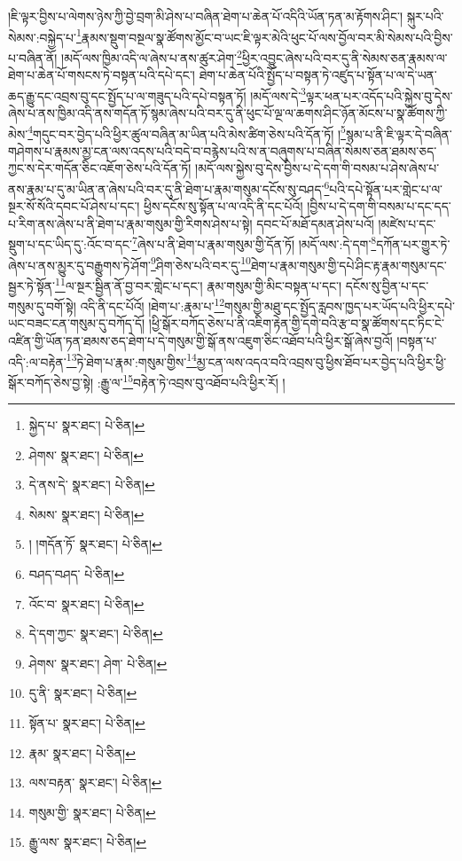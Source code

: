 །ཇི་ལྟར་བྱིས་པ་ལེགས་ཉེས་ཀྱི་བྱེ་བྲག་མི་ཤེས་པ་བཞིན་ཐེག་པ་ཆེན་པོ་འདིའི་ཡོན་ཏན་མ་རྟོགས་ཤིང་། སྐུར་པའི་སེམས་:བསྐྱེད་པ་\footnote{སྐྱེད་པ་  སྣར་ཐང་།  པེ་ཅིན། }རྣམས་སྡུག་བསྔལ་སྣ་ཚོགས་མྱོང་བ་ཡང་ཇི་ལྟར་མེའི་ཕུང་པོ་ལས་བྱོལ་བར་མི་སེམས་པའི་བྱིས་པ་བཞིན་ནོ། །མདོ་ལས་ཁྱིམ་འདི་ལ་ཞེས་པ་ནས་ཚུར་ཤེག་\footnote{ཤེགས་  སྣར་ཐང་།  པེ་ཅིན། }ཕྱིར་འབྱུང་ཞེས་པའི་བར་དུ་ནི་སེམས་ཅན་རྣམས་ལ་ཐེག་པ་ཆེན་པོ་གསངས་ཏེ་བསྟན་པའི་དཔེ་དང་། ཐེག་པ་ཆེན་པོའི་སྤྱོད་པ་བསྟན་ཏེ་འཛུད་པ་སྟོན་པ་ལ་དེ་ཡན་ཆད་རྒྱུ་དང་འབྲས་བུ་དང་སྤྱོད་པ་ལ་གཟུད་པའི་དཔེ་བསྟན་ཏོ། །མདོ་ལས་དེ་\footnote{དེ་ནས་དེ་  སྣར་ཐང་།  པེ་ཅིན། }ལྟར་ཕན་པར་འདོད་པའི་སྐྱེས་བུ་དེས་ཞེས་པ་ནས་ཁྱིམ་འདི་ནས་གདོན་ཏོ་སྙམ་ཞེས་པའི་བར་དུ་ནི་ཕུང་པོ་ལྔ་ལ་ཆགས་ཤིང་ཉོན་མོངས་པ་སྣ་ཚོགས་ཀྱི་མེས་\footnote{སེམས་  སྣར་ཐང་།  པེ་ཅིན། }གདུང་བར་བྱེད་པའི་ཕྱིར་ཚུལ་བཞིན་མ་ཡིན་པའི་མེས་ཚིག་ཅེས་པའི་དོན་ཏོ། །\footnote{། །གདོན་ཏོ་  སྣར་ཐང་།  པེ་ཅིན། }སྙམ་པ་ནི་ཇི་ལྟར་དེ་བཞིན་གཤེགས་པ་རྣམས་མྱ་ངན་ལས་འདས་པའི་བདེ་བ་བརྙེས་པའི་ས་ན་བཞུགས་པ་བཞིན་སེམས་ཅན་ཐམས་ཅད་ཀྱང་ས་དེར་གདོན་ཅིང་འཇོག་ཅེས་པའི་དོན་ཏོ། །མདོ་ལས་སྐྱེས་བུ་དེས་བྱིས་པ་དེ་དག་གི་བསམ་པ་ཤེས་ཞེས་པ་ནས་རྣམ་པ་དུ་མ་ཡིན་ན་ཞེས་པའི་བར་དུ་ནི་ཐེག་པ་རྣམ་གསུམ་དངོས་སུ་བཤད་\footnote{བཤད་བཤད་  པེ་ཅིན། }པའི་དཔེ་སྟོན་པར་གླེང་པ་ལ་སྔར་སོ་སོའི་དབང་པོ་ཤེས་པ་དང་། ཕྱིས་དངོས་སུ་སྟོན་པ་ལ་འདི་ནི་དང་པོའོ། །བྱིས་པ་དེ་དག་གི་བསམ་པ་དང་དད་པ་རིག་ནས་ཞེས་པ་ནི་ཐེག་པ་རྣམ་གསུམ་གྱི་རིགས་ཤེས་པ་སྟེ། དབང་པོ་མཐོ་དམན་ཤེས་པའོ། །མཛེས་པ་དང་སྡུག་པ་དང་ཡིད་དུ་:འོང་བ་དང་\footnote{འོང་བ་  སྣར་ཐང་།  པེ་ཅིན། }ཞེས་པ་ནི་ཐེག་པ་རྣམ་གསུམ་གྱི་དོན་ཏོ། །མདོ་ལས་:དེ་དག་\footnote{དེ་དག་ཀྱང་  སྣར་ཐང་།  པེ་ཅིན། }དཀོན་པར་གྱུར་ཏེ་ཞེས་པ་ནས་མྱུར་དུ་བརྒྱུགས་ཏེ་ཤོག་\footnote{ཤེགས་  སྣར་ཐང་། ཤེག་  པེ་ཅིན། }ཤིག་ཅེས་པའི་བར་དུ་\footnote{དུ་ནི་  སྣར་ཐང་།  པེ་ཅིན། }ཐེག་པ་རྣམ་གསུམ་གྱི་དཔེ་ཤིང་རྟ་རྣམ་གསུམ་དང་སྦྱར་ཏེ་སྟོན་\footnote{སྟོན་པ་  སྣར་ཐང་།  པེ་ཅིན། }ལ་སྔར་སྦྱིན་ནོ་བྱ་བར་གླེང་པ་དང་། རྣམ་གསུམ་གྱི་མིང་བསྟན་པ་དང་། དངོས་སུ་བྱིན་པ་དང་གསུམ་དུ་བགོ་སྟེ། འདི་ནི་དང་པོའོ། །ཐེག་པ་:རྣམ་པ་\footnote{རྣམ་  སྣར་ཐང་།  པེ་ཅིན། }གསུམ་གྱི་མཐུ་དང་སྤྱོད་རླབས་ཁྱད་པར་ཡོད་པའི་ཕྱིར་དཔེ་ཡང་བཟང་ངན་གསུམ་དུ་བཀོད་དོ། །ཕྱི་སྒོར་བཀོད་ཅེས་པ་ནི་འཇིག་རྟེན་གྱི་དགེ་བའི་རྩ་བ་སྣ་ཚོགས་དང་ཏིང་ངེ་འཛིན་གྱི་ཡོན་ཏན་ཐམས་ཅད་ཐེག་པ་དེ་གསུམ་གྱི་སྒོ་ནས་འཇུག་ཅིང་འཐོབ་པའི་ཕྱིར་སྒོ་ཞེས་བྱའོ། །བསྟན་པ་འདི་:ལ་བརྟེན་\footnote{ལས་བརྟན་  སྣར་ཐང་།  པེ་ཅིན། }ཏེ་ཐེག་པ་རྣམ་:གསུམ་གྱིས་\footnote{གསུམ་གྱི་  སྣར་ཐང་།  པེ་ཅིན། }མྱ་ངན་ལས་འདའ་བའི་འབྲས་བུ་ཕྱིས་ཐོབ་པར་བྱེད་པའི་ཕྱིར་ཕྱི་སྒོར་བཀོད་ཅེས་བྱ་སྟེ། :རྒྱུ་ལ་\footnote{རྒྱུ་ལས་  སྣར་ཐང་།  པེ་ཅིན། }བརྟེན་ཏེ་འབྲས་བུ་འཐོབ་པའི་ཕྱིར་རོ། །
